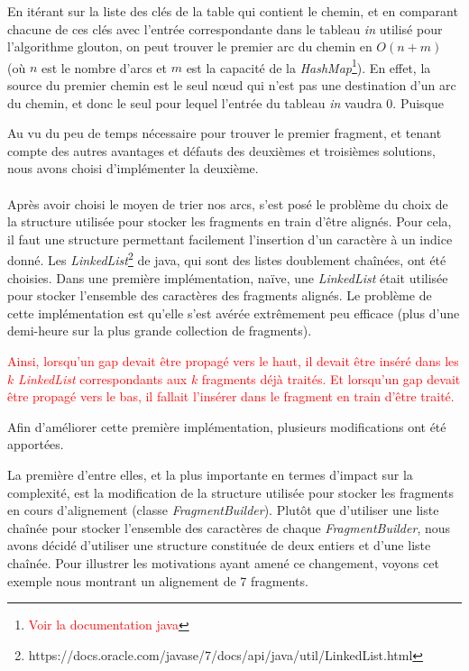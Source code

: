 \documentclass{article}
\begin{document}
En itérant sur la liste des clés de la table qui contient le chemin, et en comparant chacune de ces clés avec l'entrée correspondante dans le tableau \textit{in} utilisé pour l'algorithme glouton, on peut trouver le premier arc du chemin en $O(n+m)$ (où $n$ est le nombre d'arcs et $m$ est la capacité de la \textit{HashMap}\footnote{\textcolor{red}{Voir la documentation java}}). En effet, la source du premier chemin est le seul nœud qui n'est pas une destination d'un arc du chemin, et donc le seul pour lequel l'entrée du tableau \textit{in} vaudra $0$. Puisque 

Au vu du peu de temps nécessaire pour trouver le premier fragment, et tenant compte des autres avantages et défauts des deuxièmes et troisièmes solutions, nous avons choisi d'implémenter la deuxième.
\\~\\ 
 
Après avoir choisi le moyen de trier nos arcs, s'est posé le problème du choix de la structure utilisée pour stocker les fragments en train d'être alignés. Pour cela, il faut une structure permettant facilement l'insertion d'un caractère à un indice donné. Les \textit{LinkedList}\footnote{https://docs.oracle.com/javase/7/docs/api/java/util/LinkedList.html} de java, qui sont des listes doublement chaînées, ont été choisies. Dans une première implémentation, naïve, une \textit{LinkedList} était utilisée pour stocker l'ensemble des caractères des fragments alignés. 
Le problème de cette implémentation est qu'elle s'est avérée extrêmement peu efficace (plus d'une demi-heure sur la plus grande collection de fragments). 

\textcolor{red}{
Ainsi, lorsqu'un gap devait être propagé vers le haut, il devait être inséré dans les $k$ \textit{LinkedList} correspondants aux $k$ fragments déjà traités. Et lorsqu'un gap devait être propagé vers le bas, il fallait l'insérer dans le fragment en train d'être traité.}

Afin d'améliorer cette première implémentation, plusieurs modifications ont été apportées.

La première d'entre elles, et la plus importante en termes d'impact sur la complexité, est la modification de la structure utilisée pour stocker les fragments en cours d'alignement (classe \textit{FragmentBuilder}). Plutôt que d'utiliser une liste chaînée pour stocker l'ensemble des caractères de chaque \textit{FragmentBuilder}, nous avons décidé d'utiliser une structure constituée de deux entiers et d'une liste chaînée. Pour illustrer les motivations ayant amené ce changement, voyons cet exemple nous montrant un alignement de 7 fragments.
\end{document}
